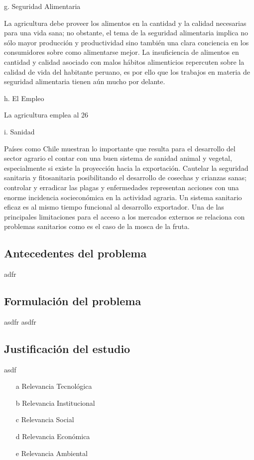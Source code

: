 \documentclass{report}
\begin{document}
g. Seguridad Alimentaria

La agricultura debe proveer los alimentos en la cantidad y la calidad necesarias para una vida sana; no obstante, el tema de la seguridad alimentaria implica no sólo mayor producción y productividad sino también una clara conciencia en los consumidores sobre como alimentarse mejor. La insuficiencia de alimentos en cantidad y calidad asociado con malos hábitos alimenticios repercuten sobre la calidad de vida del habitante peruano, es por ello que los trabajos en materia de seguridad alimentaria tienen aún mucho por delante.

h. El Empleo

La agricultura emplea al 26%

i. Sanidad

Países como Chile muestran lo importante que resulta para el desarrollo del
sector agrario el contar con una buen sistema de sanidad animal y vegetal,
especialmente si existe la proyección hacia la exportación. Cautelar la
seguridad sanitaria y fitosanitaria posibilitando el desarrollo de cosechas y
crianzas sanas; controlar y erradicar las plagas y enfermedades representan
acciones con una enorme incidencia socieconómica en la actividad agraria. Un
sistema sanitario eficaz es al mismo tiempo funcional al desarrollo exportador.
Una de las principales limitaciones para el acceso a los mercados externos se
relaciona con problemas sanitarios como es el caso de la mosca de la fruta.


\subsection{Antecedentes del problema}
adfr
\subsection{Formulación del problema}
asdfr
asdfr
\subsection{Justificación del estudio}
asdf
\begin{enumerate}
\item[a] Relevancia Tecnológica
\item[b] Relevancia Institucional
\item[c] Relevancia Social
\item[d] Relevancia Económica
\item[e] Relevancia Ambiental
\end{enumerate}
\end{document}
